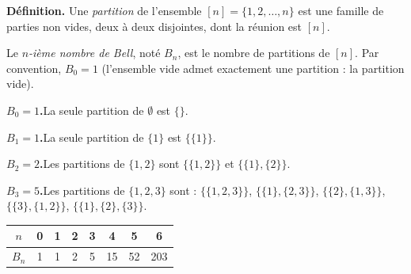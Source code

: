 ﻿%



\begin{tcolorbox}[thmbox]
  \textbf{Définition.}\enspace{}
  Une \emph{partition} de l'ensemble $[n] = \{1,2,\ldots,n\}$
  est une famille de parties non vides, deux à deux disjointes, dont la réunion
  est $[n]$.

  \medskip
  Le \emph{$n$-ième nombre de Bell}, noté $B_n$, est le nombre de partitions
  de $[n]$. Par convention, $B_0 = 1$ (l'ensemble vide admet exactement une
  partition : la partition vide).
\end{tcolorbox}


\begin{mdframed}[style=exbar]
  \textbf{$B_0 = 1$.}\enspace La seule partition de $\emptyset$ est $\{\}$.

  \smallskip\noindent
  \textbf{$B_1 = 1$.}\enspace La seule partition de $\{1\}$ est $\bigl\{\{1\}\bigr\}$.

  \smallskip\noindent
  \textbf{$B_2 = 2$.}\enspace Les partitions de $\{1,2\}$ sont
  $\bigl\{\{1,2\}\bigr\}$ et $\bigl\{\{1\},\{2\}\bigr\}$.

  \smallskip\noindent
  \textbf{$B_3 = 5$.}\enspace Les partitions de $\{1,2,3\}$ sont :
  $\bigl\{\{1,2,3\}\bigr\}$,
  $\bigl\{\{1\},\{2,3\}\bigr\}$, $\bigl\{\{2\},\{1,3\}\bigr\}$,
  $\bigl\{\{3\},\{1,2\}\bigr\}$,
  $\bigl\{\{1\},\{2\},\{3\}\bigr\}$.

  \medskip
  \begin{center}
    \begin{tabular}{c|ccccccc}
      $n$ & 0 & 1 & 2 & 3 & 4 & 5 & 6 \\\hline
      $B_n$ & 1 & 1 & 2 & 5 & 15 & 52 & 203
    \end{tabular}
  \end{center}
\end{mdframed}

\decsep{}

